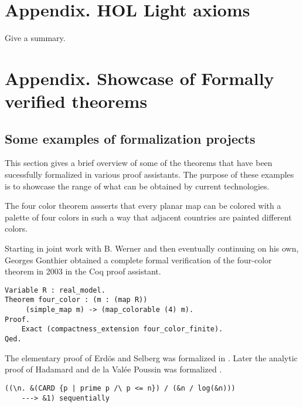 \documentclass[brochure,english,12pt]{bourbaki}
\theoremstyle{plain}
\begin{document}
\section{Appendix. HOL Light axioms}

Give a summary.


\section{Appendix. Showcase of Formally verified theorems}

\subsection{Some examples of formalization projects}

This section gives a brief overview of some of the theorems that have been sucessfully formalized
in various proof assistants.  The purpose of these examples is to showcase the range
of what can be obtained by current technologies.


The four color theorem assserts that every planar map can be colored with a palette of four colors in such a way that adjacent
countries are painted different colors.

Starting in joint work with B. Werner and then eventually continuing on his own,
Georges Gonthier obtained a complete formal verification of the four-color theorem in 2003 in
the Coq proof assistant.

\begin{lstlisting}[keepspaces=true,stringstyle=\tt,basicstyle=\small,frame=single,framesep=8pt,morekeywords={Variable,Theorem,Proof,Qed},columns=flexible,caption={Four-color theorem in Coq}]
Variable R : real_model. 
Theorem four_color : (m : (map R))
     (simple_map m) -> (map_colorable (4) m). 
Proof.
    Exact (compactness_extension four_color_finite). 
Qed.
\end{lstlisting}


The elementary proof of Erd\"os and Selberg was formalized in \cite{XX}.  Later the analytic proof of Hadamard and de la Val\'ee Poussin
was formalized \cite{XX}.

\begin{lstlisting}[keepspaces=true,stringstyle=\tt,basicstyle=\small,frame=single,framesep=8pt,mathescape,morekeywords={theorem,fixes,assumes,defines,shows,Variable,Theorem,Proof,Qed},columns=flexible,caption={The prime number theorem}]
  ((\n. &(CARD {p | prime p /\ p <= n}) / (&n / log(&n)))
    ---> &1) sequentially
\end{lstlisting}
\end{document}
